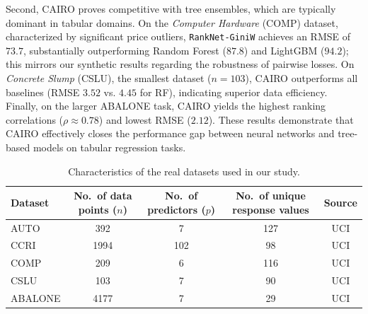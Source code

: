 \documentclass[11pt]{article}
\theoremstyle{plain}
\theoremstyle{plain}
\theoremstyle{plain}
\theoremstyle{plain}
\theoremstyle{plain}
\theoremstyle{plain}
\theoremstyle{plain}
\begin{document}
Second, \textsc{CAIRO} proves competitive with tree ensembles, which are typically dominant in tabular domains. On the \textit{Computer Hardware} (COMP) dataset, characterized by significant price outliers, \texttt{RankNet-GiniW} achieves an RMSE of $73.7$, substantially outperforming Random Forest ($87.8$) and LightGBM ($94.2$); this mirrors our synthetic results regarding the robustness of pairwise losses. On \textit{Concrete Slump} (CSLU), the smallest dataset ($n=103$), \textsc{CAIRO} outperforms all baselines (RMSE $3.52$ vs. $4.45$ for RF), indicating superior data efficiency. Finally, on the larger ABALONE task, \textsc{CAIRO} yields the highest ranking correlations ($\rho \approx 0.78$) and lowest RMSE ($2.12$). These results demonstrate that \textsc{CAIRO} effectively closes the performance gap between neural networks and tree-based models on tabular regression tasks.


\begin{table}[H]
    \centering
    \caption{Characteristics of the real datasets used in our study.}
    \label{tab:realdata}
    \renewcommand{\arraystretch}{1.05} %
    \begin{tabular}{lcccc}
        \toprule
        Dataset & No.\ of data points ($n$) & No.\ of predictors ($p$) & No.\ of unique response values & Source \\
        \midrule
        AUTO     & 392  & 7   & 127 & UCI \\
        CCRI     & 1994 & 102 &  98 & UCI \\
        COMP     & 209  & 6   & 116 & UCI \\
        CSLU     & 103  & 7   &  90 & UCI \\
        ABALONE  & 4177 & 7   &  29 & UCI \\
        \bottomrule
    \end{tabular}
\end{table}
\end{document}
